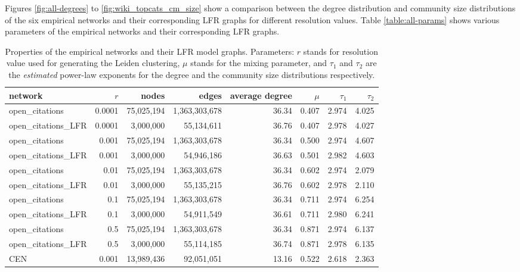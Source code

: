 \documentclass[a4paper]{article}   	%
\begin{document}
Figures \ref{fig:all-degrees} to \ref{fig:wiki_topcats_cm_size} show a comparison between the degree distribution and community size distributions of the six empirical networks and their corresponding LFR graphs for different resolution values. Table \ref{table:all-params} shows various parameters of the empirical networks and their corresponding LFR graphs.

\begin{table}[h!]
\caption[Properties of the empirical networks and their LFR model graphs.]{Properties of the empirical networks and their LFR model graphs.  Parameters: $r$ stands for resolution value used for generating the Leiden clustering, $\mu$ stands for the mixing parameter, and $\tau_1$ and $\tau_2$ are the \textit{estimated} power-law exponents for the degree and the community size distributions respectively.}
\centering
\begin{tabular}{lrrrrrrr}
\hline
network              & $r$      & nodes      & edges         & average degree & $\mu$    & $\tau_1$  & $\tau_2$  \\ \hline \hline
open\_citations      & 0.0001 & 75,025,194 & 1,363,303,678 & 36.34    & 0.407 & 2.974 & 4.025 \\
open\_citations\_LFR & 0.0001 & 3,000,000  & 55,134,611    & 36.76    & 0.407 & 2.978 & 4.027 \\\hline
open\_citations      & 0.001  & 75,025,194 & 1,363,303,678 & 36.34    & 0.500 & 2.974 & 4.607 \\
open\_citations\_LFR & 0.001  & 3,000,000  & 54,946,186    & 36.63    & 0.501 & 2.982 & 4.603 \\ \hline
open\_citations      & 0.01   & 75,025,194 & 1,363,303,678 & 36.34    & 0.602 & 2.974 & 2.079 \\
open\_citations\_LFR & 0.01   & 3,000,000  & 55,135,215    & 36.76    & 0.602 & 2.978 & 2.110 \\ \hline
open\_citations      & 0.1    & 75,025,194 & 1,363,303,678 & 36.34    & 0.711 & 2.974 & 6.254 \\
open\_citations\_LFR & 0.1    & 3,000,000  & 54,911,549    & 36.61    & 0.711 & 2.980 & 6.241 \\ \hline
open\_citations      & 0.5    & 75,025,194 & 1,363,303,678 & 36.34    & 0.871 & 2.974 & 6.137 \\
open\_citations\_LFR & 0.5    & 3,000,000  & 55,114,185    & 36.74    & 0.871 & 2.978 & 6.135 \\ \hline\hline
CEN      & 0.001 & 13,989,436 & 92,051,051 & 13.16    & 0.522 & 2.618 & 2.363 \\

\end{tabular}
\end{table}
\end{document}

